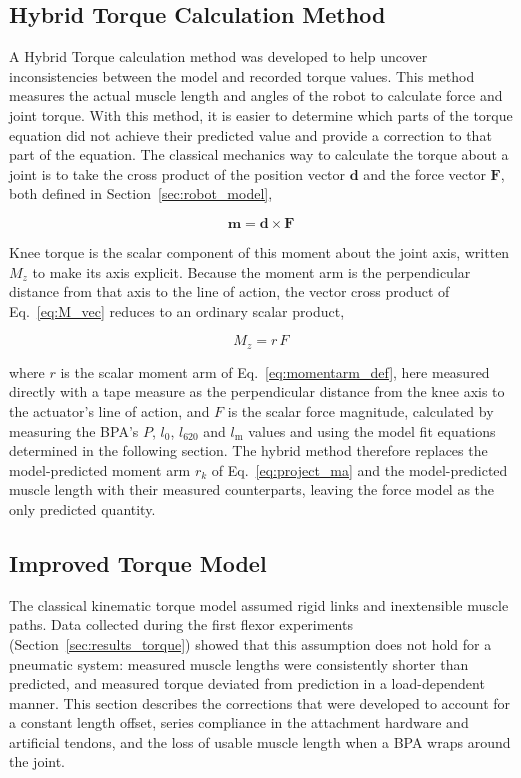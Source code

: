 \subsection{Hybrid Torque Calculation Method}\label{sec:hybrid_method}


A Hybrid Torque calculation method was developed to help uncover inconsistencies between the model and recorded torque values. This method measures the actual muscle length and angles of the robot to calculate force and joint torque. With this method, it is easier to determine which parts of the torque equation did not achieve their predicted value and provide a correction to that part of the equation. The classical mechanics way to calculate the torque about a joint is to take the cross product of the position vector $\mathbf{d}$ and the force vector $\mathbf{F}$, both defined in Section~\ref{sec:robot_model},

\begin{equation}
    \mathbf{m} = \mathbf{d} \times \mathbf{F} \label{eq:M_vec}
\end{equation}

Knee torque is the scalar component of this moment about the joint axis, written $M_{z}$ to make its axis explicit. Because the moment arm is the perpendicular distance from that axis to the line of action, the vector cross product of Eq.~\eqref{eq:M_vec} reduces to an ordinary scalar product,

\begin{equation}
    M_{z} = r\,F \label{eq:M_scalar}
\end{equation}

where $r$ is the scalar moment arm of Eq.~\eqref{eq:momentarm_def}, here measured directly with a tape measure as the perpendicular distance from the knee axis to the actuator's line of action, and $F$ is the scalar force magnitude, calculated by measuring the BPA's $P$, $l_{0}$, $l_{620}$ and $l_\text{m}$ values and using the model fit equations determined in the following section. The hybrid method therefore replaces the model-predicted moment arm $r_{k}$ of Eq.~\eqref{eq:project_ma} and the model-predicted muscle length with their measured counterparts, leaving the force model as the only predicted quantity.

\subsection{Improved Torque Model}\label{sec:improved_model}

The classical kinematic torque model assumed rigid links and inextensible muscle paths. Data collected during the first flexor experiments (Section~\ref{sec:results_torque}) showed that this assumption does not hold for a pneumatic system: measured muscle lengths were consistently shorter than predicted, and measured torque deviated from prediction in a load-dependent manner. This section describes the corrections that were developed to account for a constant length offset, series compliance in the attachment hardware and artificial tendons, and the loss of usable muscle length when a BPA wraps around the joint.


